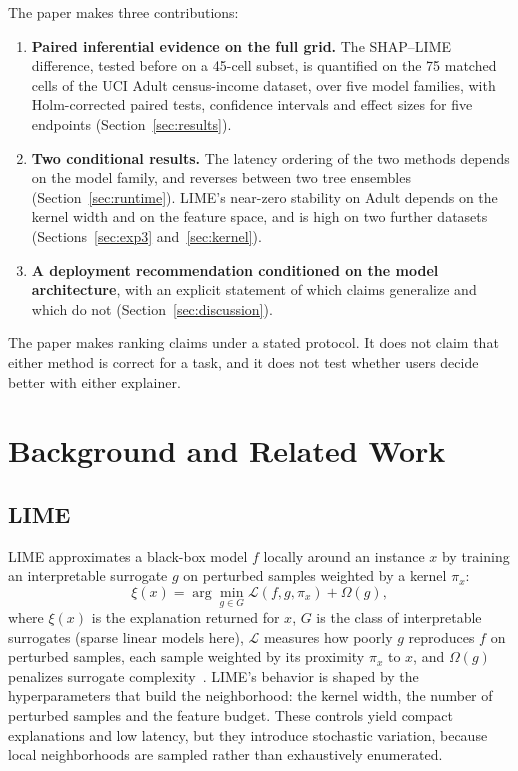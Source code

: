 \documentclass{cleiej}
\begin{document}
The paper makes three contributions:
\begin{enumerate}
\item \textbf{Paired inferential evidence on the full grid.} The SHAP--LIME
difference, tested before on a 45-cell subset, is quantified on the 75
matched cells of the UCI Adult census-income dataset, over five model
families, with Holm-corrected paired tests, confidence intervals and effect
sizes for five endpoints (Section~\ref{sec:results}).
\item \textbf{Two conditional results.} The latency ordering of the two
methods depends on the model family, and reverses between two tree
ensembles (Section~\ref{sec:runtime}). LIME's near-zero stability on Adult
depends on the kernel width and on the feature space, and is high on two
further datasets (Sections~\ref{sec:exp3} and~\ref{sec:kernel}).
\item \textbf{A deployment recommendation conditioned on the model
architecture}, with an explicit statement of which claims generalize and
which do not (Section~\ref{sec:discussion}).
\end{enumerate}

The paper makes ranking claims under a stated protocol. It does not claim
that either method is correct for a task, and it does not test whether users
decide better with either explainer.

\section{Background and Related Work}
\label{sec:background}

\subsection{LIME}

LIME approximates a black-box model $f$ locally around an instance $x$ by
training an interpretable surrogate $g$ on perturbed samples weighted by a
kernel $\pi_x$:
\begin{equation}
\xi(x) = \arg\min_{g \in G} \mathcal{L}(f, g, \pi_x) + \Omega(g),
\label{eq:lime}
\end{equation}
where $\xi(x)$ is the explanation returned for $x$, $G$ is the class of
interpretable surrogates (sparse linear models here), $\mathcal{L}$
measures how poorly $g$ reproduces $f$ on perturbed samples, each sample
weighted by its proximity $\pi_x$ to $x$, and $\Omega(g)$ penalizes
surrogate complexity~\cite{ribeiro2016why}. LIME's behavior is shaped by
the hyperparameters that build the neighborhood: the kernel width, the
number of perturbed samples and the feature budget. These controls yield
compact explanations and low latency, but they introduce stochastic
variation, because local neighborhoods are sampled rather than exhaustively
enumerated.
\end{document}
